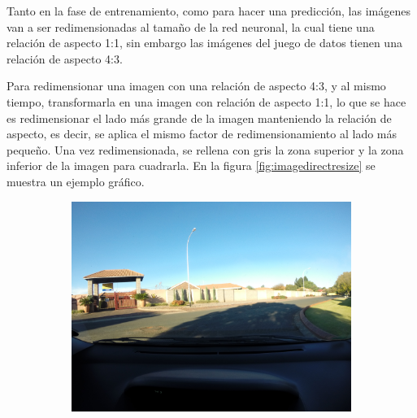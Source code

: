 Tanto en la fase de entrenamiento, como para hacer una predicción, las imágenes van a ser redimensionadas al tamaño de la red neuronal, la cual tiene una relación de aspecto 1:1, sin embargo las imágenes del juego de datos tienen una relación de aspecto 4:3.

Para redimensionar una imagen con una relación de aspecto 4:3, y al mismo tiempo, transformarla en una imagen con relación de aspecto 1:1, lo que se hace es redimensionar el lado más grande de la imagen manteniendo la relación de aspecto, es decir, se aplica el mismo factor de redimensionamiento al lado más pequeño. Una vez redimensionada, se rellena con gris la zona superior y la zona inferior de la imagen para cuadrarla. En la figura \ref{fig:imagedirectresize} se muestra un ejemplo gráfico.

\begin{figure}[H]
	\centering
	\begin{subfigure}[h]{0.45\linewidth}
		\includegraphics[width=\linewidth]{images/image_direct_resize_before.jpg}
	\end{subfigure}
	\begin{subfigure}[h]{0.45\linewidth}

\end{subfigure}
\end{figure}

